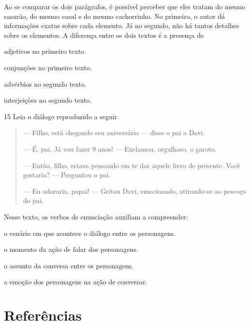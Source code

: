 Ao se comparar os dois parágrafos, é possível perceber que eles tratam
do mesmo casarão, do mesmo casal e do mesmo cachorrinho. No primeiro, o
autor dá informações exatas sobre cada elemento. Já no segundo, não há
tantos detalhes sobre os elementos. A diferença entre os dois textos é a
presença de

\begin{escolha}
\item adjetivos no primeiro texto.

\item conjunções no primeiro texto.

\item advérbios no segundo texto.

\item interjeições no segundo texto.
\end{escolha}


\num{15} Leia o diálogo reproduzido a seguir.

\begin{quote}
--- Filho, está chegando seu aniversário --- disse o pai a Davi.

--- É, pai. Já vou fazer 9 anos! --- Exclamou, orgulhoso, o
garoto.

--- Então, filho, estava pensando em te dar aquele livro de
presente. Você gostaria? --- Perguntou o pai.

--- Eu adoraria, papai! --- Gritou Davi, emocionado, atirando-se
ao pescoço do pai.

\end{quote}

Nesse texto, os verbos de enunciação auxiliam a compreender:

\begin{escolha}
\item o cenário em que acontece o diálogo entre os personagens.

\item o momento da ação de falar dos personagens.

\item o assunto da conversa entre os personagens.

\item a emoção dos personagens na ação de conversar.
\end{escolha}


\chapter{Referências}

